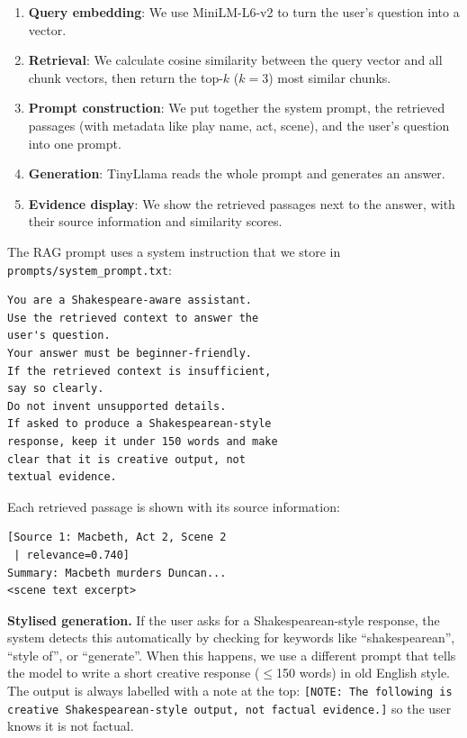 \documentclass[10pt,conference]{IEEEtran}
\begin{document}
\begin{enumerate}
    \item \textbf{Query embedding}: We use MiniLM-L6-v2 to turn the user's question into a vector.
    \item \textbf{Retrieval}: We calculate cosine similarity between the query vector and all chunk vectors, then return the top-$k$ ($k=3$) most similar chunks.
    \item \textbf{Prompt construction}: We put together the system prompt, the retrieved passages (with metadata like play name, act, scene), and the user's question into one prompt.
    \item \textbf{Generation}: TinyLlama reads the whole prompt and generates an answer.
    \item \textbf{Evidence display}: We show the retrieved passages next to the answer, with their source information and similarity scores.
\end{enumerate}

The RAG prompt uses a system instruction that we store in \texttt{prompts/system\_prompt.txt}:

\begin{lstlisting}[language={}]
You are a Shakespeare-aware assistant.
Use the retrieved context to answer the
user's question.
Your answer must be beginner-friendly.
If the retrieved context is insufficient,
say so clearly.
Do not invent unsupported details.
If asked to produce a Shakespearean-style
response, keep it under 150 words and make
clear that it is creative output, not
textual evidence.
\end{lstlisting}

Each retrieved passage is shown with its source information:

\begin{lstlisting}[language={}]
[Source 1: Macbeth, Act 2, Scene 2
 | relevance=0.740]
Summary: Macbeth murders Duncan...
<scene text excerpt>
\end{lstlisting}

\textbf{Stylised generation.} If the user asks for a Shakespearean-style response, the system detects this automatically by checking for keywords like ``shakespearean'', ``style of'', or ``generate''. When this happens, we use a different prompt that tells the model to write a short creative response ($\leq$150 words) in old English style. The output is always labelled with a note at the top: \texttt{[NOTE: The following is creative Shakespearean-style output, not factual evidence.]} so the user knows it is not factual.
\end{document}
